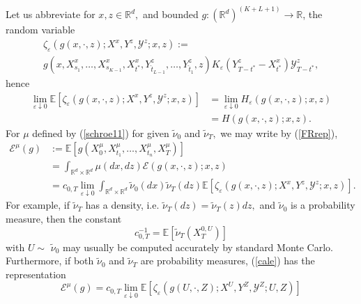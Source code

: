 \documentclass[a4paper,11pt]{amsart}
\theoremstyle{plain}
\theoremstyle{remark}
\begin{document}
Let us abbreviate for $x,z\in\mathbb{R}^{d},$ and bounded $g:\left(
\mathbb{R}^{d}\right)  ^{(K+L+1)}\rightarrow\mathbb{R}$, the random variable%
\begin{multline*}
\zeta_{\varepsilon}(g\left(  x,\cdot,z\right)  ;X^{x},Y^{z},\mathcal{Y}%
^{z};x,z):=\\
g\left(  x,X_{s_{1}}^{x},\ldots,X_{s_{K-1}}^{x},X_{t^{\ast}}^{x}%
,Y_{\widehat{t}_{L-1}}^{z},\ldots,Y_{\widehat{t}_{1}}^{z},z\right)
K_{\varepsilon}(Y_{T-t^{\ast}}^{z}-X_{t^{\ast}}^{x})\mathcal{Y}_{T-t^{\ast}%
}^{z},
\end{multline*}
hence
\begin{align*}
\lim_{\varepsilon\downarrow0}\mathbb{E}\left[  \zeta_{\varepsilon}(g\left(
x,\cdot,z\right)  ;X^{x},Y^{z},\mathcal{Y}^{z};x,z)\right]   &  =\lim
_{\varepsilon\downarrow0}H_{\varepsilon}(g\left(  x,\cdot,z\right)  ;x,z)\\
&  =H(g\left(  x,\cdot,z\right)  ;x,z).
\end{align*}
For $\mu$ defined by (\ref{schroe11}) for given $\widetilde{\nu}_{0}$ and
$\widetilde{\nu}_{T},$ we may write by (\ref{FRrep}),
\begin{align}
\mathcal{E}^{\mu}\left(  g\right)   &  :=\mathbb{E}\left[  g(X_{0}^{\mu
},X_{t_{1}}^{\mu},\ldots,X_{t_{n}}^{\mu},X_{T}^{\mu})\right] \label{cale}\\
&  =\int_{\mathbb{R}^{d}\times\mathbb{R}^{d}}\mu(dx,dz)\mathcal{E}%
(g(x,\cdot,z);x,z)\nonumber\\
&  =c_{0,T}\lim_{\varepsilon\downarrow0}\int_{\mathbb{R}^{d}\times
\mathbb{R}^{d}}\widetilde{\nu}_{0}(dx)\widetilde{\nu}_{T}(dz)\mathbb{E}\left[
\zeta_{\varepsilon}(g\left(  x,\cdot,z\right)  ;X^{x},Y^{z},\mathcal{Y}%
^{z};x,z)\right]  .\nonumber
\end{align}
For example, if $\widetilde{\nu}_{T}$ has a density, i.e. $\widetilde{\nu}%
_{T}(dz)=\widetilde{\nu}_{T}(z)dz,$ and $\widetilde{\nu}_{0}$ is a probability
measure, then the constant%
\[
c_{0,T}^{-1}=\mathbb{E}\left[  \widetilde{\nu}_{T}(X_{T}^{0,U})\right]
\]
with $U\sim$ $\widetilde{\nu}_{0}$ may usually be computed accurately by
standard Monte Carlo. Furthermore, if both $\widetilde{\nu}_{0}$ and
$\widetilde{\nu}_{T}$ are probability measures, (\ref{cale}) has the
representation%
\begin{equation}
\mathcal{E}^{\mu}\left(  g\right)  =c_{0,T}\lim_{\varepsilon\downarrow
0}\mathbb{E}\left[  \zeta_{\varepsilon}(g\left(  U,\cdot,Z\right)
;X^{U},Y^{Z},\mathcal{Y}^{Z};U,Z)\right]  \label{prepe}%
\end{equation}
\end{document}
